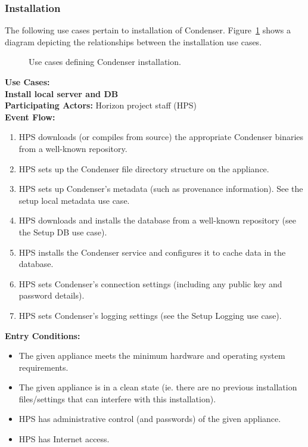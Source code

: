 \subsubsection{Installation}		 
The following use cases pertain to installation of Condenser. Figure~\ref{InstallationUsages} shows a diagram depicting the relationships between the installation use cases.
\begin{center}
	\begin{figure}[htbp]
		\caption{Use cases defining Condenser installation.\label{InstallationUsages}}
	\end{figure}
\end{center}	
\textbf{Use Cases:}\\

		\textbf{Install local server and DB}\\	 
		\textbf{Participating Actors:} Horizon project staff (HPS)  \\
		\textbf{Event Flow:}
		\begin{enumerate}
\item HPS downloads (or compiles from source) the appropriate Condenser binaries from a well-known repository.
\item HPS sets up the Condenser file directory structure on the appliance.
\item HPS sets up Condenser's metadata (such as provenance information). See the setup local metadata use case.
\item HPS downloads and installs the database from a well-known repository (see the Setup DB use case).
\item HPS installs the Condenser service and configures it to cache data in the database.
\item HPS sets Condenser's connection settings (including any public key and password details).
\item HPS sets Condenser's logging settings (see the Setup Logging use case).
	    \end{enumerate}
		\textbf{Entry Conditions:}
		\begin{itemize}
\item The given appliance meets the minimum hardware and operating system requirements.
\item The given appliance is in a clean state (ie. there are no previous installation files/settings that can interfere with this installation).
\item HPS has administrative control (and passwords) of the given appliance.
\item HPS has Internet access.
	    \end{itemize}
